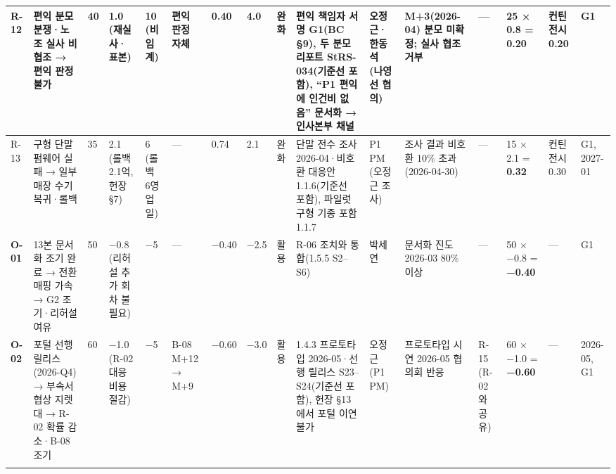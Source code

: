 \documentclass[10pt,a4paper]{article}
\begin{document}
{\begin{longtable}{|L{9mm}|L{33mm}|C{7mm}|L{12mm}|L{11mm}|L{12mm}|C{9mm}|C{9mm}|L{11mm}|L{32mm}|L{17mm}|L{20mm}|L{18mm}|L{15mm}|L{13mm}|L{10mm}|}
R-12 & 편익 분모 분쟁·노조 실사 비협조 → 편익 판정 불가 & 40 & 1.0 (재실사·표본) & 10 (비임계) & 편익 판정 자체 & 0.40 & 4.0 & 완화 & 편익 책임자 서명 G1(BC §9), 두 분모 리포트 StRS-034(기준선 포함), “P1 편익에 인건비 없음” 문서화 → 인사본부 채널 & 오정근·한동석 (나영선 협의) & M+3(2026-04) 분모 미확정; 실사 협조 거부 & — & 25 × 0.8 = \textbf{0.20} & 컨틴전시 0.20 & G1 \\ \hline
R-13 & 구형 단말 펌웨어 실패 → 일부 매장 수기 복귀·롤백 & 35 & 2.1 (롤백 2.1억, 헌장 §7) & 6 (롤백 6영업일) & — & 0.74 & 2.1 & 완화 & 단말 전수 조사 2026-04·비호환 대응안 1.1.6(기준선 포함), 파일럿 구형 기종 포함 1.1.7 & P1 PM (오정근 조사) & 조사 결과 비호환 10\% 초과(2026-04-30) & — & 15 × 2.1 = \textbf{0.32} & 컨틴전시 0.30 & G1, 2027-01 \\ \hline
\textbf{O-01} & 13본 문서화 조기 완료 → 전환 매핑 가속 → G2 조기·리허설 여유 & 50 & −0.8 (리허설 추가 회차 불필요) & −5 & — & −0.40 & −2.5 & 활용 & R-06 조치와 통합(1.5.5 S2–S6) & 박세연 & 문서화 진도 2026-03 80\% 이상 & — & 50 × −0.8 = \textbf{−0.40} & — & G1 \\ \hline
\textbf{O-02} & 포털 선행 릴리스(2026-Q4) → 부속서 협상 지렛대 → R-02 확률 감소·B-08 조기 & 60 & −1.0 (R-02 대응 비용 절감) & −5 & B-08 M+12 → M+9 & −0.60 & −3.0 & 활용 & 1.4.3 프로토타입 2026-05·선행 릴리스 S23–S24(기준선 포함), 헌장 §13에서 포털 이연 불가 & 오정근 (P1 PM) & 프로토타입 시연 2026-05 협의회 반응 & R-15 (R-02와 공유) & 60 × −1.0 = \textbf{−0.60} & — & 2026-05, G1 \\ \hline
\fi
\end{longtable}}
\end{document}
